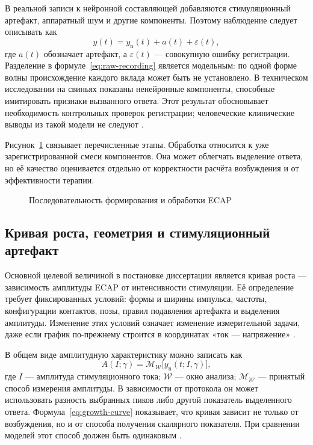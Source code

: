 В реальной записи к нейронной составляющей добавляются стимуляционный артефакт, аппаратный шум и другие компоненты. Поэтому наблюдение следует описывать как
\begin{equation}
 y(t)=y_{\mathrm n}(t)+a(t)+\varepsilon(t),
 \label{eq:raw-recording}
\end{equation}
где $a(t)$ обозначает артефакт, а $\varepsilon(t)$ --- совокупную ошибку регистрации. Разделение в формуле~\eqref{eq:raw-recording} является модельным: по одной форме волны происхождение каждого вклада может быть не установлено. В техническом исследовании на свиньях показаны ненейронные компоненты, способные имитировать признаки вызванного ответа. Этот результат обосновывает необходимость контрольных проверок регистрации; человеческие клинические выводы из такой модели не следуют \cite{s798}.

Рисунок~\ref{fig:ecap-formation} связывает перечисленные этапы. Обработка относится к уже зарегистрированной смеси компонентов. Она может облегчать выделение ответа, но её качество оценивается отдельно от корректности расчёта возбуждения и от эффективности терапии.

\begin{figure}[htbp]
\centering

\caption{Последовательность формирования и обработки ECAP}
\label{fig:ecap-formation}
\end{figure}
\FloatBarrier

\subsection{Кривая роста, геометрия и стимуляционный артефакт}

Основной целевой величиной в постановке диссертации является кривая роста --- зависимость амплитуды ECAP от интенсивности стимуляции. Её определение требует фиксированных условий: формы и ширины импульса, частоты, конфигурации контактов, позы, правил подавления артефакта и выделения амплитуды. Изменение этих условий означает изменение измерительной задачи, даже если график по-прежнему строится в координатах «ток --- напряжение» \cite{posture,s787}.

В общем виде амплитудную характеристику можно записать как
\begin{equation}
 A(I;\gamma)=\mathcal M_{\mathcal W}
 \bigl[y_{\mathrm n}(t;I,\gamma)\bigr],
 \label{eq:growth-curve}
\end{equation}
где $I$ --- амплитуда стимуляционного тока; $\mathcal W$ --- окно анализа; $\mathcal M_{\mathcal W}$ --- принятый способ измерения амплитуды. В зависимости от протокола он может использовать разность выбранных пиков либо другой показатель выделенного ответа. Формула~\eqref{eq:growth-curve} показывает, что кривая зависит не только от возбуждения, но и от способа получения скалярного показателя. При сравнении моделей этот способ должен быть одинаковым \cite{posture,s159}.


